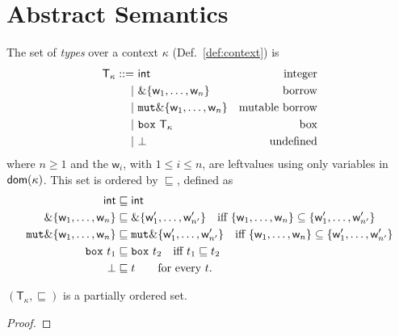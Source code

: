\section{Abstract Semantics}\label{sec:abstract_semantics}

\begin{definition}[Types]
  The set of \emph{types} over a context $\kappa$ (Def.~\ref{def:context}) is
  \begin{align*}
    \mathsf{T}_\kappa ::=&\ \mathsf{int} & \text{integer}\\
    | &\ \&\{\mathsf{w}_1,\ldots,\mathsf{w}_n\} & \text{borrow}\\
    | &\ \mathtt{mut}\&\{\mathsf{w}_1,\ldots,\mathsf{w}_n\} & \text{mutable borrow}\\
    | &\ \mathtt{box}\ \mathsf{T}_\kappa & \text{box}\\
    | &\ \bot & \text{undefined}
  \end{align*}
  where $n\ge 1$ and the $\mathsf{w}_i$, with $1\le i\le n$, are leftvalues
  using only variables in $\mathsf{dom}(\kappa)$. This set is ordered by $\sqsubseteq$, defined as
  \begin{align*}
    \mathsf{int}&\sqsubseteq\mathsf{int}\\
    \&\{\mathsf{w}_1,\ldots,\mathsf{w}_n\} & \sqsubseteq
    \&\{\mathsf{w}'_1,\ldots,\mathsf{w}'_{n'}\} \quad\text{iff $\{\mathsf{w}_1,\ldots,\mathsf{w}_n\}\subseteq\{\mathsf{w}'_1,\ldots,\mathsf{w}'_{n'}\}$}\\
    \mathtt{mut}\&\{\mathsf{w}_1,\ldots,\mathsf{w}_n\} & \sqsubseteq
    \mathtt{mut}\&\{\mathsf{w}'_1,\ldots,\mathsf{w}'_{n'}\} \quad\text{iff $\{\mathsf{w}_1,\ldots,\mathsf{w}_n\}\subseteq\{\mathsf{w}'_1,\ldots,\mathsf{w}'_{n'}\}$}\\
    \mathtt{box}\ t_1&\sqsubseteq\mathtt{box}\ t_2 \quad\text{iff $t_1\sqsubseteq t_2$}\\
    \bot&\sqsubseteq t\qquad\text{for every $t$.}
  \end{align*}
\end{definition}

\begin{lemma}
  \label{lemma:partial-order-types}
  $(\mathsf{T}_\kappa,\sqsubseteq)$ is a partially ordered set.
\end{lemma}
\begin{proof}
\end{proof}

